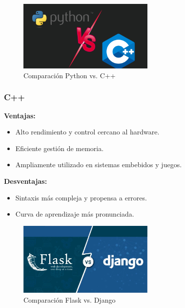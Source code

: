 \documentclass[12pt, a4paper]{article}
\begin{document}
	\vspace{0.3cm}
	
	\begin{figure}[ht]
		\centering
		\includegraphics[width=0.6\textwidth]{images/python_vs_cpp.png}
		\caption{Comparación Python vs. C++}
		\label{fig:python_cpp}
	\end{figure}
	
	\vspace{0.5cm}
	
	\subsubsection*{C++}
	
	\textbf{Ventajas:}
	\begin{itemize}
		\item Alto rendimiento y control cercano al hardware.
		\item Eficiente gestión de memoria.
		\item Ampliamente utilizado en sistemas embebidos y juegos.
	\end{itemize}
	
	\textbf{Desventajas:}
	\begin{itemize}
		\item Sintaxis más compleja y propensa a errores.
		\item Curva de aprendizaje más pronunciada.
	\end{itemize}
	
	\vspace{0.3cm}
	
	\begin{figure}[ht]
		\centering
		\includegraphics[width=0.6\textwidth]{images/django_vs_flask.png}
		\caption{Comparación Flask vs. Django}
		\label{fig:flask_django}
	\end{figure}
	
\end{document}
